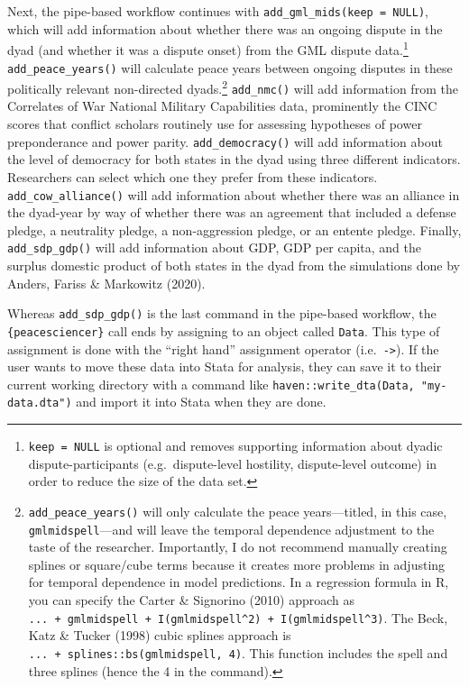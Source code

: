 \documentclass[
  11pt,
]{article}
\begin{document}
Next, the pipe-based workflow continues with \texttt{add\_gml\_mids(keep\ =\ NULL)}, which will add information about whether there was an ongoing dispute in the dyad (and whether it was a dispute onset) from the GML dispute data.\footnote{\texttt{keep\ =\ NULL} is optional and removes supporting information about dyadic dispute-participants (e.g.~dispute-level hostility, dispute-level outcome) in order to reduce the size of the data set.} \texttt{add\_peace\_years()} will calculate peace years between ongoing disputes in these politically relevant non-directed dyads.\footnote{\texttt{add\_peace\_years()} will only calculate the peace years---titled, in this case, \texttt{gmlmidspell}---and will leave the temporal dependence adjustment to the taste of the researcher. Importantly, I do not recommend manually creating splines or square/cube terms because it creates more problems in adjusting for temporal dependence in model predictions. In a regression formula in R, you can specify the Carter \& Signorino (2010) approach as \texttt{...\ +\ gmlmidspell\ +\ I(gmlmidspell\^{}2)\ +\ I(gmlmidspell\^{}3)}. The Beck, Katz \& Tucker (1998) cubic splines approach is \texttt{...\ +\ splines::bs(gmlmidspell,\ 4)}. This function includes the spell and three splines (hence the 4 in the command).} \texttt{add\_nmc()} will add information from the Correlates of War National Military Capabilities data, prominently the CINC scores that conflict scholars routinely use for assessing hypotheses of power preponderance and power parity. \texttt{add\_democracy()} will add information about the level of democracy for both states in the dyad using three different indicators. Researchers can select which one they prefer from these indicators. \texttt{add\_cow\_alliance()} will add information about whether there was an alliance in the dyad-year by way of whether there was an agreement that included a defense pledge, a neutrality pledge, a non-aggression pledge, or an entente pledge. Finally, \texttt{add\_sdp\_gdp()} will add information about GDP, GDP per capita, and the surplus domestic product of both states in the dyad from the simulations done by Anders, Fariss \& Markowitz (2020).

Whereas \texttt{add\_sdp\_gdp()} is the last command in the pipe-based workflow, the \texttt{\{peacesciencer\}} call ends by assigning to an object called \texttt{Data}. This type of assignment is done with the ``right hand'' assignment operator (i.e.~\texttt{-\textgreater{}}). If the user wants to move these data into Stata for analysis, they can save it to their current working directory with a command like \texttt{haven::write\_dta(Data,\ "my-data.dta")} and import it into Stata when they are done.
\end{document}
